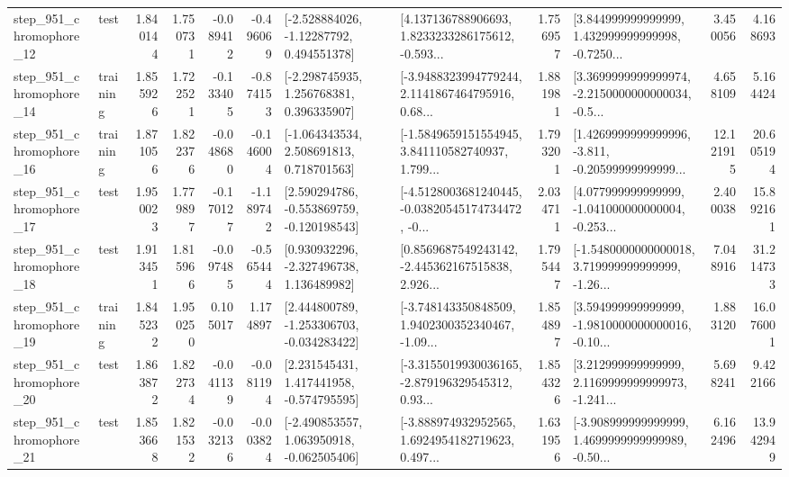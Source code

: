 \begin{tabular}{llrrrrllrlrr}
  step\_951\_chromophore\_12 &      test &      1.840144 &    1.750731 &     -0.089412 & -0.496069 &    [-2.528884026, -1.12287792, 0.494551378] &  [4.137136788906693, 1.8233233286175612, -0.593... &       1.756957 &  [3.844999999999999, 1.432999999999998, -0.7250... &            3.450056 &          4.168693 \\
  step\_951\_chromophore\_14 &  training &      1.855926 &    1.722521 &     -0.133405 & -0.874153 &    [-2.298745935, 1.256768381, 0.396335907] &  [-3.9488323994779244, 2.1141867464795916, 0.68... &       1.881981 &  [3.3699999999999974, -2.2150000000000034, -0.5... &            4.658109 &          5.164424 \\
  step\_951\_chromophore\_16 &  training &      1.871056 &    1.822376 &     -0.048680 & -0.146004 &    [-1.064343534, 2.508691813, 0.718701563] &  [-1.5849659151554945, 3.841110582740937, 1.799... &       1.793201 &  [1.4269999999999996, -3.811, -0.20599999999999... &           12.121915 &         20.605194 \\
  step\_951\_chromophore\_17 &      test &      1.950023 &    1.779897 &     -0.170127 & -1.189742 &   [2.590294786, -0.553869759, -0.120198543] &  [-4.5128003681240445, -0.03820545174734472, -0... &       2.034711 &  [4.077999999999999, -1.041000000000004, -0.253... &            2.400038 &         15.892161 \\
  step\_951\_chromophore\_18 &      test &      1.913451 &    1.815966 &     -0.097485 & -0.565444 &    [0.930932296, -2.327496738, 1.136489982] &  [0.8569687549243142, -2.445362167515838, 2.926... &       1.795447 &  [-1.5480000000000018, 3.719999999999999, -1.26... &            7.048916 &         31.214733 \\
  step\_951\_chromophore\_19 &  training &      1.845232 &    1.950250 &      0.105017 &  1.174897 &   [2.444800789, -1.253306703, -0.034283422] &  [-3.748143350848509, 1.9402300352340467, -1.09... &       1.854897 &  [3.594999999999999, -1.9810000000000016, -0.10... &            1.883120 &         16.076001 \\
  step\_951\_chromophore\_20 &      test &      1.863872 &    1.822734 &     -0.041139 & -0.081194 &    [2.231545431, 1.417441958, -0.574795595] &  [-3.3155019930036165, -2.879196329545312, 0.93... &       1.854326 &  [3.212999999999999, 2.1169999999999973, -1.241... &            5.698241 &          9.422166 \\
  step\_951\_chromophore\_21 &      test &      1.853668 &    1.821532 &     -0.032136 & -0.003824 &   [-2.490853557, 1.063950918, -0.062505406] &  [-3.888974932952565, 1.6924954182719623, 0.497... &       1.631956 &  [-3.908999999999999, 1.4699999999999989, -0.50... &            6.162496 &         13.942949 \\

\end{tabular}
